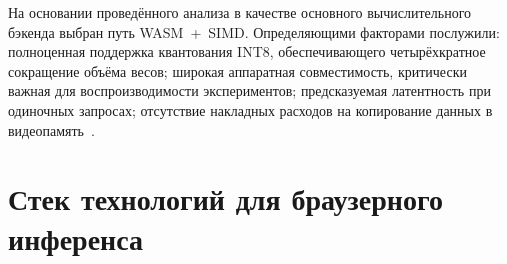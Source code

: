 \begin{table}[H]
\centering
\caption{Характеристики бэкендов ONNX Runtime Web}
\label{tab:backend_comparison}
\end{table}

На основании проведённого анализа в качестве основного вычислительного бэкенда выбран путь WASM~+~SIMD. Определяющими факторами послужили: полноценная поддержка квантования INT8, обеспечивающего четырёхкратное сокращение объёма весов; широкая аппаратная совместимость, критически важная для воспроизводимости экспериментов; предсказуемая латентность при одиночных запросах; отсутствие накладных расходов на копирование данных в видеопамять~\cite{jia2024empowering, wang2024anatomizing}.

\section{Стек технологий для браузерного инференса} \label{sec:стек_технологий_для_браузерного_инференса}

